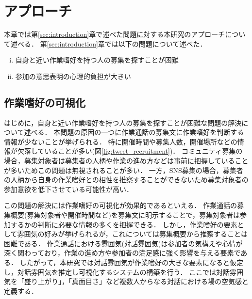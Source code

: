 \chapter{アプローチ\label{sec:approach}}
\thispagestyle{plain}

本章では第\ref{sec:introduction}章で述べた問題に対する本研究のアプローチについて述べる．
第\ref{sec:introduction}章では以下の問題について述べた．

\begin{enumerate}[i.]
    \item 自身と近い作業嗜好を持つ人の募集を探すことが困難
    \item 参加の意思表明の心理的負担が大きい
\end{enumerate}

\section{作業嗜好の可視化\label{node:approach_i}}

はじめに，自身と近い作業嗜好を持つ人の募集を探すことが困難な問題の解決について述べる．
本問題の原因の一つに作業通話の募集文に作業嗜好を判断する情報が少ないことが挙げられる．
特に開催時間や募集人数，開催場所などの情報が欠落していることが多い(図\ref{fig:tweet_recruitment})．
コミュニティ募集の場合，募集対象者は募集者の人柄や作業の進め方などは事前に把握していることが多いためこの問題は無視されることが多い．
一方，SNS募集の場合，募集者の人柄から自身の作業嗜好との相性を推察することができないため募集対象者の参加意欲を低下させている可能性が高い．

この問題の解決には作業嗜好の可視化が効果的であるといえる．
作業通話の募集概要(募集対象者や開催時間など)を募集文に明示することで，募集対象者は参加するかの判断に必要な情報の多くを把握できる．
しかし，作業嗜好の要素として雰囲気の好みが挙げられるが，これについては募集概要から推察することは困難である．
作業通話における雰囲気(対話雰囲気)は参加者の気構えや心情が深く関わっており，作業の進め方や参加者の満足感に強く影響を与える要素である．
したがって，本研究では対話雰囲気が作業嗜好の大きな要素になると仮定し，対話雰囲気を推定し可視化するシステムの構築を行う．
ここでは対話雰囲気を「盛り上がり」，「真面目さ」など複数人からなる対話における場の空気感と定義する．

